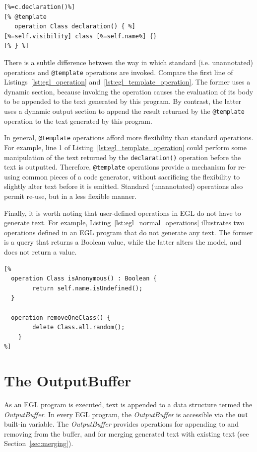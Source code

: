 \begin{lstlisting}[float=tbp, caption=Using a template operation to specify the text generated for a declaration of a Java class., label=lst:egl_template_operation, language=EGL]
[%=c.declaration()%]
[% @template
   operation Class declaration() { %]
[%=self.visibility] class [%=self.name%] {}
[% } %]
\end{lstlisting}

There is a subtle difference between the way in which standard (i.e. unannotated) operations and \texttt{@template} operations are invoked. Compare the first line of Listings~\ref{lst:egl_operation} and~\ref{lst:egl_template_operation}. The former uses a dynamic section, because invoking the operation causes the evaluation of its body to be appended to the text generated by this program. By contrast, the latter uses a dynamic output section to append the result returned by the \texttt{@template} operation to the text generated by this program.

In general, \texttt{@template} operations afford more flexibility than standard operations. For example, line 1 of Listing~\ref{lst:egl_template_operation} could perform some manipulation of the text returned by the \texttt{declaration()} operation before the text is outputted. Therefore, \texttt{@template} operations provide a mechanism for re-using common pieces of a code generator, without sacrificing the flexibility to slightly alter text before it is emitted. Standard (unannotated) operations also permit re-use, but in a less flexible manner.

Finally, it is worth noting that user-defined operations in EGL do not have to generate text. For example, Listing~\ref{lst:egl_normal_operations} illustrates two operations defined in an EGL program that do not generate any text. The former is a query that returns a Boolean value, while the latter alters the model, and does not return a value.

\begin{lstlisting}[float=tbp, caption=Operations that do not generate any text., label=lst:egl_normal_operations, language=EGL]
[%
  operation Class isAnonymous() : Boolean {
		return self.name.isUndefined();
  }

  operation removeOneClass() {
		delete Class.all.random();
	}
%]
\end{lstlisting}

\section{The OutputBuffer}
As an EGL program is executed, text is appended to a data structure termed the \emph{OutputBuffer}. In every EGL program, the \emph{OutputBuffer} is accessible via the \texttt{out} built-in variable. The \emph{OutputBuffer} provides operations for appending to and removing from the buffer, and for merging generated text with existing text (see Section~\ref{sec:merging}).

